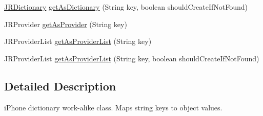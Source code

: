 \begin{DoxyCompactItemize}
\item 
\hyperlink{classcom_1_1janrain_1_1android_1_1engage_1_1types_1_1_j_r_dictionary}{JRDictionary} \hyperlink{classcom_1_1janrain_1_1android_1_1engage_1_1types_1_1_j_r_dictionary_a755a04e077b2d3fa3a873291a88bc5ca}{getAsDictionary} (String key, boolean shouldCreateIfNotFound)
\item 
JRProvider \hyperlink{classcom_1_1janrain_1_1android_1_1engage_1_1types_1_1_j_r_dictionary_abfc2e2a58233fbafaf0f656ea1605159}{getAsProvider} (String key)
\item 
JRProviderList \hyperlink{classcom_1_1janrain_1_1android_1_1engage_1_1types_1_1_j_r_dictionary_a3d43f450a54f2551649bc91d4bc455e0}{getAsProviderList} (String key)
\item 
JRProviderList \hyperlink{classcom_1_1janrain_1_1android_1_1engage_1_1types_1_1_j_r_dictionary_afbdfbae12eecf224274969948522f65e}{getAsProviderList} (String key, boolean shouldCreateIfNotFound)
\end{DoxyCompactItemize}


\subsection{Detailed Description}
iPhone dictionary work-\/alike class. Maps string keys to object values. 

